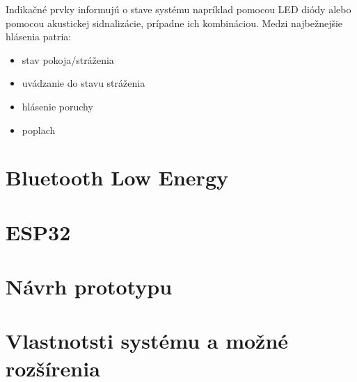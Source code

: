 Indikačné prvky informujú o stave systému napríklad pomocou LED diódy alebo pomocou akustickej sidnalizácie, prípadne ich kombináciou. Medzi najbežnejšie hlásenia patria:
\begin{itemize}
    \item stav pokoja/stráženia
    \item uvádzanie do stavu stráženia
    \item hlásenie poruchy
    \item poplach
\end{itemize}

\chapter{Bluetooth Low Energy}

\chapter{ESP32}

\chapter{Návrh prototypu}

\chapter{Vlastnotsti systému a možné rozšírenia}
